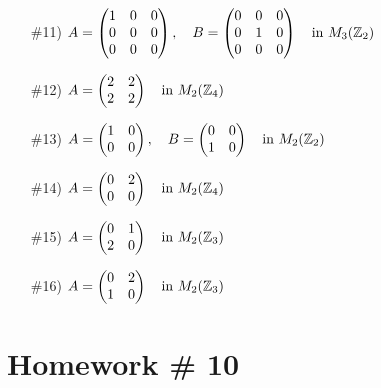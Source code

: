 \begin{enumerate}
    \item[\#11)] \( A = \begin{pmatrix} 1 & 0 & 0 \\ 0 & 0 & 0 \\ 0 & 0 & 0 \end{pmatrix}, \quad 
                   B = \begin{pmatrix} 0 & 0 & 0 \\ 0 & 1 & 0 \\ 0 & 0 & 0 \end{pmatrix} 
                   \quad \text{in } M_3({\mathbb{ Z}}_2) \)
    \item[\#12)] \( A = \begin{pmatrix} 2 & 2 \\ 2 & 2 \end{pmatrix} 
                   \quad \text{in } M_2({\mathbb{ Z}}_4) \)
    \item[\#13)] \( A = \begin{pmatrix} 1 & 0 \\ 0 & 0 \end{pmatrix}, \quad 
                  B = \begin{pmatrix} 0 & 0 \\ 1 & 0 \end{pmatrix} 
                  \quad \text{in } M_2({\mathbb{ Z}}_2) \)
    \item[\#14)] \( A = \begin{pmatrix} 0 & 2 \\ 0 & 0 \end{pmatrix} 
                   \quad \text{in } M_2({\mathbb{ Z}}_4) \)
    \item[\#15)] \( A = \begin{pmatrix} 0 & 1 \\ 2 & 0 \end{pmatrix} 
                  \quad \text{in } M_2({\mathbb{ Z}}_3) \)
    \item[\#16)] \( A = \begin{pmatrix} 0 & 2 \\ 1 & 0 \end{pmatrix} 
                  \quad \text{in } M_2({\mathbb{ Z}}_3) \)
\end{enumerate}

\newpage

\section{Homework \# 10}
\label{sec:HW10}

